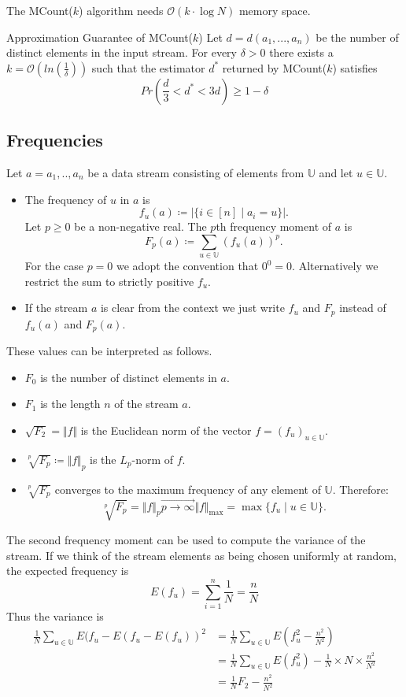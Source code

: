 \documentclass[english]{panikzettel}
\begin{document}
The MCount($k$) algorithm needs $\mathcal{O}(k\cdot \log N)$ memory space.

\begin{theo}{Approximation Guarantee of MCount($k$)}
Let $d=d(a_1,...,a_n)$ be the number of distinct elements in the input stream. For every $\delta > 0$ there exists a $k=\mathcal{O}(ln(\frac{1}{\delta}))$ such that the estimator $d^*$ returned by MCount($k$) satisfies
\[
Pr(\frac{d}{3}<d^* < 3d)\geq 1-\delta
\]
\end{theo}

\subsection{Frequencies}
Let $a=a_1,..,a_n$ be a data stream consisting of elements from $\mathbb{U}$ and let $u\in\mathbb{U}$.
\begin{itemize}
\item The frequency of $u$ in $a$ is
\[
f_u(a)\coloneqq  |\{i \in [n] \mid a_i=u \}|.
\]
Let $p\geq 0$ be a non-negative real. The $p$th frequency moment of $a$ is
\[
F_p(a)\coloneqq \sum_{u\in\mathbb{U}}(f_u(a))^p.
\]
For the case $p=0$ we adopt the convention that $0^0=0$. Alternatively we restrict the sum to strictly positive $f_u$.
\item If the stream $a$ is clear from the context we just write $f_u$ and $F_p$ instead of $f_u(a)$ and $F_p(a)$.
\end{itemize}
These values can be interpreted as follows.
\begin{itemize}
\item $F_0$ is the number of distinct elements in $a$.
\item $F_1$ is the length $n$ of the stream $a$.
\item $\sqrt{F_2}=\Vert f\Vert$ is the Euclidean norm of the vector $f=(f_u)_{u\in \mathbb{U}}$.
\item $\sqrt[p]{F_p}\coloneqq\Vert f \Vert_p$ is the $L_p$-norm of $f$.
\item $\sqrt[p]{F_p}$ converges to the maximum frequency of any element of $\mathbb{U}$. Therefore:
\[
\sqrt[p]{F_p} = \Vert f\Vert_p \overrightarrow{p\to\infty} \Vert f\Vert_{\max} = \max \{ f_u\mid u\in\mathbb{U} \}.
\]
\end{itemize}
The second frequency moment can be used to compute the variance of the stream. If we think of the stream elements as being chosen uniformly at random, the expected frequency is
\[
E(f_u)=\sum_{i=1}^n\frac{1}{N}=\frac{n}{N}
\]
Thus the variance is
\begin{align*}
\frac{1}{N}\sum_{u\in\mathbb{U}}E(f_u-E(f_u-E(f_u))^2 &= \frac{1}{N}\sum_{u\in\mathbb{U}} E(f_u^2-\frac{n^2}{N^2})\\
&= \frac{1}{N}\sum_{u\in\mathbb{U}} E(f_u^2)-\frac{1}{N}\times N\times \frac{n^2}{N^2}\\
&= \frac{1}{N}F_2-\frac{n^2}{N^2}
\end{align*}
\end{document}
